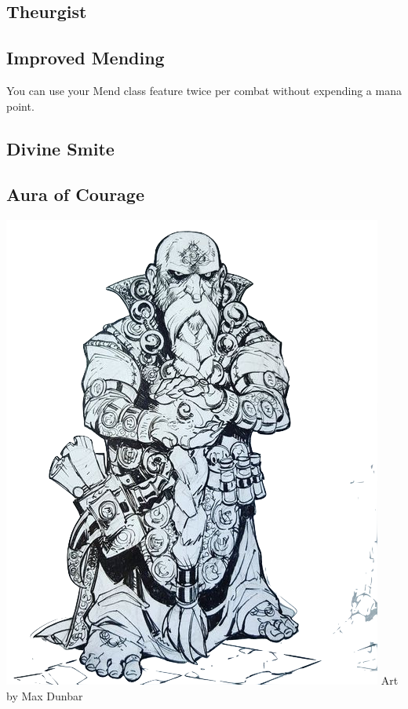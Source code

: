 
\begin{multicols*}{2}

\section{Theurgist}

\subsection*{Improved Mending}

You can use your Mend class feature twice per combat without expending a mana point.

\subsection*{Divine Smite}

\subsection*{Aura of Courage}




\begin{Figure}
\centering
\includegraphics[width=\textwidth]{img/cleric.png}
{\scriptsize Art by Max Dunbar}
\end{Figure}
    
\end{multicols*}

    